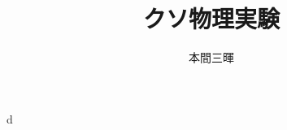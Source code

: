 \documentclass[titlepage,a4paper]{jsarticle}
\title{クソ物理実験}                     %
\author{本間三暉}                       %
\begin{document}
\maketitle
d
\end{document}
